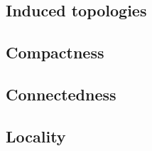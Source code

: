 \documentclass[11pt]{article}
\begin{document}
\subsection{Induced topologies}


\subsection{Compactness}

\subsection{Connectedness}


\subsection{Locality}


\end{document}
